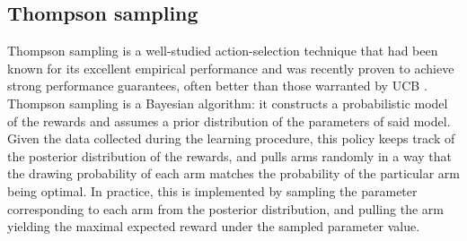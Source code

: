 \documentclass[preprint,12pt]{elsarticle}
\begin{document}
\subsection{Thompson sampling}
\label{section:bandits_thompsons}	
Thompson sampling \cite{thompson1933likelihood} is a well-studied action-selection technique that had been known for its excellent empirical performance \cite{CL11} and was recently proven to achieve strong performance guarantees, often better than those warranted by UCB \cite{AG12,KKM12,KKM13}. Thompson sampling is a Bayesian algorithm: it constructs a probabilistic model of the rewards and assumes a prior distribution of the parameters of said model. Given the data collected during the learning procedure, this policy keeps track of the posterior distribution of the rewards, and pulls arms randomly in a way that the drawing probability of each arm matches the probability of the particular arm being optimal. In practice, this is implemented by sampling the parameter corresponding to each arm from the posterior distribution, and pulling the arm yielding the maximal expected reward under the sampled parameter value.
\end{document}
